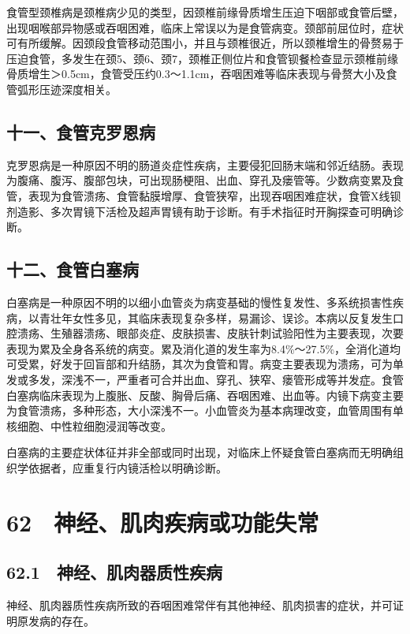 食管型颈椎病是颈椎病少见的类型，因颈椎前缘骨质增生压迫下咽部或食管后壁，出现咽喉部异物感或吞咽困难，临床上常误以为是食管病变。颈部前屈位时，症状可有所缓解。因颈段食管移动范围小，并且与颈椎很近，所以颈椎增生的骨赘易于压迫食管，多发生在颈5、颈6、颈7，颈椎正侧位片和食管钡餐检查显示颈椎前缘骨质增生＞0.5cm，食管受压约0.3～1.1cm，吞咽困难等临床表现与骨赘大小及食管弧形压迹深度相关。

\subsection{十一、食管克罗恩病}

克罗恩病是一种原因不明的肠道炎症性疾病，主要侵犯回肠末端和邻近结肠。表现为腹痛、腹泻、腹部包块，可出现肠梗阻、出血、穿孔及瘘管等。少数病变累及食管，表现为食管溃疡、食管黏膜增厚、食管狭窄，出现吞咽困难症状，食管X线钡剂造影、多次胃镜下活检及超声胃镜有助于诊断。有手术指征时开胸探查可明确诊断。

\subsection{十二、食管白塞病}

白塞病是一种原因不明的以细小血管炎为病变基础的慢性复发性、多系统损害性疾病，以青壮年女性多见，其临床表现复杂多样，易漏诊、误诊。本病以反复发生口腔溃疡、生殖器溃疡、眼部炎症、皮肤损害、皮肤针刺试验阳性为主要表现，次要表现为累及全身各系统的病变。累及消化道的发生率为8.4\%～27.5\%，全消化道均可受累，好发于回盲部和升结肠，其次为食管和胃。病变主要表现为溃疡，可为单发或多发，深浅不一，严重者可合并出血、穿孔、狭窄、瘘管形成等并发症。食管白塞病临床表现为上腹胀、反酸、胸骨后痛、吞咽困难、出血等。内镜下病变主要为食管溃疡，多种形态，大小深浅不一。小血管炎为基本病理改变，血管周围有单核细胞、中性粒细胞浸润等改变。

白塞病的主要症状体征并非全部或同时出现，对临床上怀疑食管白塞病而无明确组织学依据者，应重复行内镜活检以明确诊断。

\protect\hypertarget{text00157.html}{}{}

\section{62　神经、肌肉疾病或功能失常}

\subsection{62.1　神经、肌肉器质性疾病}

神经、肌肉器质性疾病所致的吞咽困难常伴有其他神经、肌肉损害的症状，并可证明原发病的存在。

